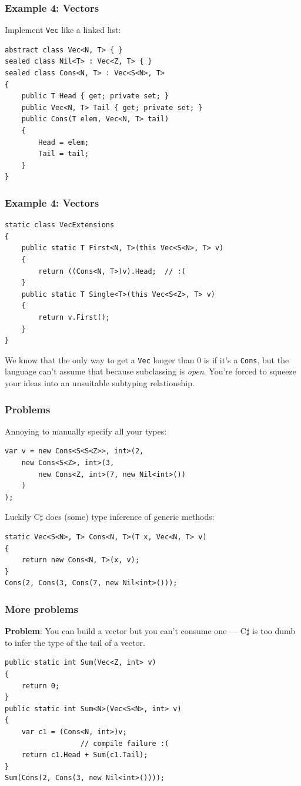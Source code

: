 \documentclass{beamer}
\begin{document}
  \begin{frame}[fragile]
    \frametitle{Example 4: Vectors}
    Implement \texttt{Vec} like a linked list:
    \begin{verbatim}
abstract class Vec<N, T> { }
sealed class Nil<T> : Vec<Z, T> { }
sealed class Cons<N, T> : Vec<S<N>, T>
{
    public T Head { get; private set; }
    public Vec<N, T> Tail { get; private set; }
    public Cons(T elem, Vec<N, T> tail)
    {
        Head = elem;
        Tail = tail;
    }
}
    \end{verbatim}
\end{frame}

  \begin{frame}[fragile]
    \frametitle{Example 4: Vectors}
    \begin{verbatim}
static class VecExtensions
{
    public static T First<N, T>(this Vec<S<N>, T> v)
    {
        return ((Cons<N, T>)v).Head;  // :(
    }
    public static T Single<T>(this Vec<S<Z>, T> v)
    {
        return v.First();
    }
}
    \end{verbatim}
    
    We know that the only way to get a \texttt{Vec} longer than 0 is if it's a \texttt{Cons},
    but the language can't assume that because subclassing is \emph{open}.
    You're forced to squeeze your ideas into an unsuitable subtyping relationship.
\end{frame}

  \begin{frame}[fragile]
    \frametitle{Problems}
    Annoying to manually specify all your types:
    \begin{verbatim}
var v = new Cons<S<S<Z>>, int>(2,
    new Cons<S<Z>, int>(3,
        new Cons<Z, int>(7, new Nil<int>())
    )
);
    \end{verbatim}
    
    \pause
    
    Luckily C$\sharp$ does (some) type inference of generic methods:
    
    \begin{verbatim}
static Vec<S<N>, T> Cons<N, T>(T x, Vec<N, T> v)
{
    return new Cons<N, T>(x, v);
}
Cons(2, Cons(3, Cons(7, new Nil<int>()));
    \end{verbatim}
\end{frame}

  \begin{frame}[fragile]
    \frametitle{More problems}
    \textbf{Problem}: You can build a vector but you can't consume one ---
    C$\sharp$ is too dumb to infer the type of the tail of a vector.
    
    \begin{verbatim}
public static int Sum(Vec<Z, int> v)
{
    return 0;
}
public static int Sum<N>(Vec<S<N>, int> v)
{
    var c1 = (Cons<N, int>)v;
                  // compile failure :(
    return c1.Head + Sum(c1.Tail);
}
Sum(Cons(2, Cons(3, new Nil<int>())));
    \end{verbatim}
\end{frame}
\end{document}
